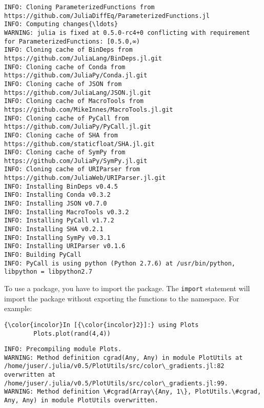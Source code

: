 \documentclass[11pt]{article}
\begin{document}
    \begin{Verbatim}[commandchars=\\\{\}]
INFO: Cloning ParameterizedFunctions from https://github.com/JuliaDiffEq/ParameterizedFunctions.jl
INFO: Computing changes{\ldots}
WARNING: julia is fixed at 0.5.0-rc4+0 conflicting with requirement for ParameterizedFunctions: [0.5.0,∞)
INFO: Cloning cache of BinDeps from https://github.com/JuliaLang/BinDeps.jl.git
INFO: Cloning cache of Conda from https://github.com/JuliaPy/Conda.jl.git
INFO: Cloning cache of JSON from https://github.com/JuliaLang/JSON.jl.git
INFO: Cloning cache of MacroTools from https://github.com/MikeInnes/MacroTools.jl.git
INFO: Cloning cache of PyCall from https://github.com/JuliaPy/PyCall.jl.git
INFO: Cloning cache of SHA from https://github.com/staticfloat/SHA.jl.git
INFO: Cloning cache of SymPy from https://github.com/JuliaPy/SymPy.jl.git
INFO: Cloning cache of URIParser from https://github.com/JuliaWeb/URIParser.jl.git
INFO: Installing BinDeps v0.4.5
INFO: Installing Conda v0.3.2
INFO: Installing JSON v0.7.0
INFO: Installing MacroTools v0.3.2
INFO: Installing PyCall v1.7.2
INFO: Installing SHA v0.2.1
INFO: Installing SymPy v0.3.1
INFO: Installing URIParser v0.1.6
INFO: Building PyCall
INFO: PyCall is using python (Python 2.7.6) at /usr/bin/python, libpython = libpython2.7

    \end{Verbatim}

    To use a package, you have to import the package. The \texttt{import}
statement will import the package without exporting the functions to the
namespace. For example:

    \begin{Verbatim}[commandchars=\\\{\}]
{\color{incolor}In [{\color{incolor}2}]:} using Plots
        Plots.plot(rand(4,4))
\end{Verbatim}

    \begin{Verbatim}[commandchars=\\\{\}]
INFO: Precompiling module Plots.
WARNING: Method definition cgrad(Any, Any) in module PlotUtils at /home/juser/.julia/v0.5/PlotUtils/src/color\_gradients.jl:82 overwritten at /home/juser/.julia/v0.5/PlotUtils/src/color\_gradients.jl:99.
WARNING: Method definition \#cgrad(Array\{Any, 1\}, PlotUtils.\#cgrad, Any, Any) in module PlotUtils overwritten.

    \end{Verbatim}
\end{document}
